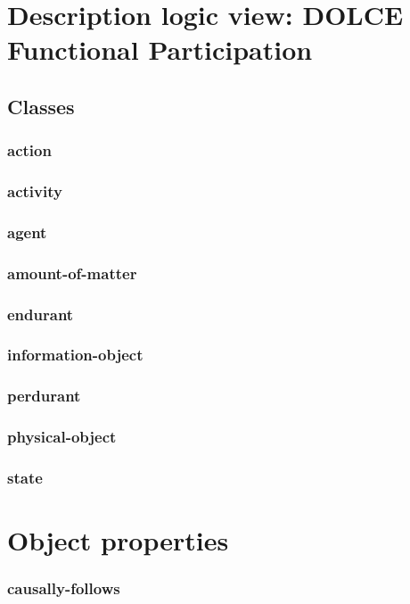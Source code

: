 \documentclass{article}
\begin{document}
\section*{Description logic view: DOLCE Functional Participation}

\subsection*{Classes}

\subsubsection*{action}

\subsubsection*{activity}

\subsubsection*{agent}

\subsubsection*{amount-of-matter}

\subsubsection*{endurant}

\subsubsection*{information-object}

\subsubsection*{perdurant}

\subsubsection*{physical-object}

\subsubsection*{state}

\section*{Object properties}\subsubsection*{causally-follows}
\end{document}
